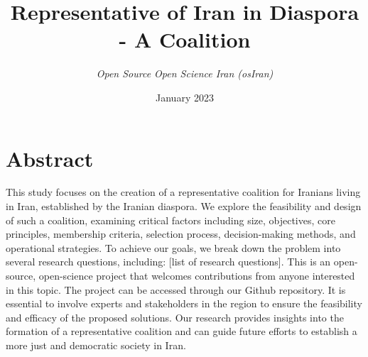 \documentclass{IEEEtran}
\title{ \Huge \textbf{Representative of Iran in Diaspora - A Coalition} \\[0.5cm]}
\author{

\textit{Open Source Open Science Iran (osIran)} \\
}
\date{January 2023}
\newcommand{\note}[1]{\todo[inline]{#1}}
\begin{document}
\maketitle




\section{Abstract}

This study focuses on the creation of a representative coalition for Iranians living in Iran, established by the Iranian diaspora. We explore the feasibility and design of such a coalition, examining critical factors including size, objectives, core principles, membership criteria, selection process, decision-making methods, and operational strategies. To achieve our goals, we break down the problem into several research questions, including: [list of research questions]. This is an open-source, open-science project that welcomes contributions from anyone interested in this topic. The project can be accessed through our Github repository. It is essential to involve experts and stakeholders in the region to ensure the feasibility and efficacy of the proposed solutions. Our research provides insights into the formation of a representative coalition and can guide future efforts to establish a more just and democratic society in Iran.

\end{document}
